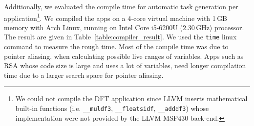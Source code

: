 Additionally, we evaluated the compile time for automatic task generation per application\footnote{We could not compile the DFT application since LLVM inserts mathematical built-in functions (i.e. \texttt{\_\_muldf3}, \texttt{\_\_floatsidf}, \texttt{\_\_adddf3}) whose implementation were not provided by the LLVM MSP430 back-end.}. We compiled the apps on a 4-core virtual machine with 1\,GB memory with Arch Linux, running on Intel Core i5-6200U (2.30\,GHz) processor. The result are given in Table~\ref{table:compiler_result}. We used the {\tt time} linux command to measure the rough time. Most of the compile time was due to pointer aliasing, when calculating possible live ranges of variables. Apps such as RSA whose code size is large and uses a lot of variables, need longer compilation time due to a larger search space for pointer aliasing.

%



